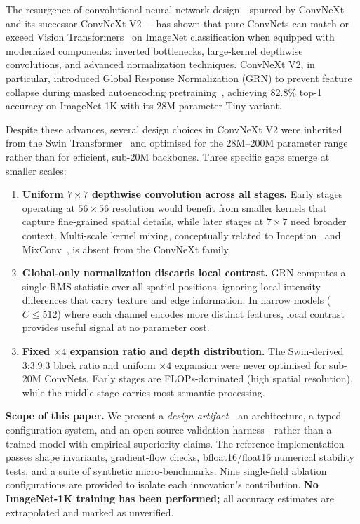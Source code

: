 \documentclass{article}
\begin{document}
The resurgence of convolutional neural network design---spurred by
ConvNeXt~\cite{liu2022convnext} and its successor ConvNeXt
V2~\cite{woo2023convnextv2}---has shown that pure ConvNets can match or
exceed Vision Transformers~\cite{dosovitskiy2020vit} on ImageNet
classification when equipped with modernized components: inverted
bottlenecks, large-kernel depthwise convolutions, and advanced
normalization techniques.  ConvNeXt V2, in particular, introduced
Global Response Normalization (GRN) to prevent feature collapse during
masked autoencoding pretraining~\cite{he2022mae}, achieving 82.8\%
top-1 accuracy on ImageNet-1K with its 28M-parameter Tiny variant.

Despite these advances, several design choices in ConvNeXt V2 were
inherited from the Swin Transformer~\cite{liu2021swin} and optimised
for the 28M--200M parameter range rather than for efficient, sub-20M
backbones.  Three specific gaps emerge at smaller scales:

\begin{enumerate}[nosep]
  \item \textbf{Uniform $7\times7$ depthwise convolution across all
        stages.}  Early stages operating at $56\times56$ resolution
        would benefit from smaller kernels that capture fine-grained
        spatial details, while later stages at $7\times7$ need broader
        context.  Multi-scale kernel mixing, conceptually related to
        Inception~\cite{szegedy2015inception} and
        MixConv~\cite{tan2019mixconv}, is absent from the ConvNeXt
        family.
  \item \textbf{Global-only normalization discards local contrast.}
        GRN computes a single RMS statistic over all spatial positions,
        ignoring local intensity differences that carry texture and edge
        information.  In narrow models ($C \leq 512$) where each channel
        encodes more distinct features, local contrast provides useful
        signal at no parameter cost.
  \item \textbf{Fixed $\times4$ expansion ratio and depth distribution.}
        The Swin-derived 3:3:9:3 block ratio and uniform $\times4$
        expansion were never optimised for sub-20M ConvNets.  Early
        stages are FLOPs-dominated (high spatial resolution), while the
        middle stage carries most semantic processing.
\end{enumerate}

\textbf{Scope of this paper.}  We present a \emph{design artifact}---an
architecture, a typed configuration system, and an open-source
validation harness---rather than a trained model with empirical
superiority claims.  The reference implementation passes shape
invariants, gradient-flow checks, bfloat16/float16 numerical stability
tests, and a suite of synthetic micro-benchmarks.  Nine single-field
ablation configurations are provided to isolate each innovation's
contribution.  \textbf{No ImageNet-1K training has been performed;}
all accuracy estimates are extrapolated and marked as unverified.
\end{document}
